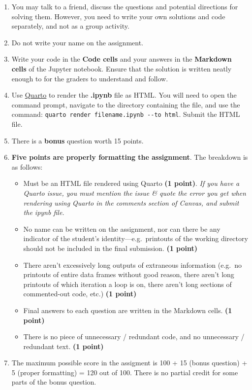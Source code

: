 \documentclass[
  letterpaper,
  DIV=11,
  numbers=noendperiod]{scrreprt}
\providecommand{\tightlist}{%
  \setlength{\itemsep}{0pt}\setlength{\parskip}{0pt}}\usepackage{longtable,booktabs,array}
\begin{document}
\begin{enumerate}
\def\labelenumi{\arabic{enumi}.}
\item
  You may talk to a friend, discuss the questions and potential
  directions for solving them. However, you need to write your own
  solutions and code separately, and not as a group activity.
\item
  Do not write your name on the assignment.
\item
  Write your code in the \textbf{Code cells} and your answers in the
  \textbf{Markdown cells} of the Jupyter notebook. Ensure that the
  solution is written neatly enough to for the graders to understand and
  follow.
\item
  Use
  \href{https://quarto.org/docs/output-formats/html-basics.html}{Quarto}
  to render the \textbf{.ipynb} file as HTML. You will need to open the
  command prompt, navigate to the directory containing the file, and use
  the command: \texttt{quarto\ render\ filename.ipynb\ -\/-to\ html}.
  Submit the HTML file.
\item
  There is a \textbf{bonus} question worth 15 points.
\item
  \textbf{Five points are properly formatting the assignment}. The
  breakdown is as follows:

  \begin{itemize}
  \tightlist
  \item
    Must be an HTML file rendered using Quarto \textbf{(1 point)}.
    \emph{If you have a Quarto issue, you must mention the issue \&
    quote the error you get when rendering using Quarto in the comments
    section of Canvas, and submit the ipynb file.}
  \item
    No name can be written on the assignment, nor can there be any
    indicator of the student's identity---e.g.~printouts of the working
    directory should not be included in the final submission. \textbf{(1
    point)}
  \item
    There aren't excessively long outputs of extraneous information
    (e.g.~no printouts of entire data frames without good reason, there
    aren't long printouts of which iteration a loop is on, there aren't
    long sections of commented-out code, etc.) \textbf{(1 point)}
  \item
    Final answers to each question are written in the Markdown cells.
    \textbf{(1 point)}
  \item
    There is no piece of unnecessary / redundant code, and no
    unnecessary / redundant text. \textbf{(1 point)}
  \end{itemize}
\item
  The maximum possible score in the assigment is 100 + 15 (bonus
  question) + 5 (proper formatting) = 120 out of 100. There is no
  partial credit for some parts of the bonus question.
\end{enumerate}
\end{document}
